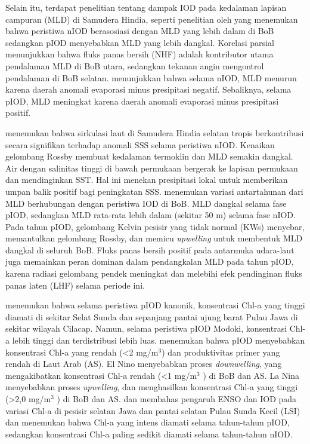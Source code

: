 \begin{spacing}{1.5}
	Selain itu, terdapat penelitian tentang dampak IOD pada kedalaman lapisan campuran (MLD) di Samudera Hindia, seperti penelitian oleh  yang menemukan bahwa peristiwa nIOD berasosiasi dengan MLD yang lebih dalam di BoB sedangkan pIOD menyebabkan MLD yang lebih dangkal. Korelasi parsial menunjukkan bahwa fluks panas bersih (NHF) adalah kontributor utama pendalaman MLD di BoB utara, sedangkan tekanan angin mengontrol pendalaman di BoB selatan.  menunjukkan bahwa selama nIOD, MLD menurun karena daerah anomali evaporasi minus presipitasi negatif. Sebaliknya, selama pIOD, MLD meningkat karena daerah anomali evaporasi minus presipitasi positif. 
	
	 menemukan bahwa sirkulasi laut di Samudera Hindia selatan tropis berkontribusi secara signifikan terhadap anomali SSS selama peristiwa nIOD. Kenaikan gelombang Rossby membuat kedalaman termoklin dan MLD semakin dangkal. Air dengan salinitas tinggi di bawah permukaan bergerak ke lapisan permukaan dan mendinginkan SST. Hal ini menekan presipitasi lokal untuk memberikan umpan balik positif bagi peningkatan SSS.  menemukan variasi antartahunan dari MLD berhubungan dengan peristiwa IOD di BoB. MLD dangkal selama fase pIOD, sedangkan MLD rata-rata lebih dalam (sekitar 50 m) selama fase nIOD. Pada tahun pIOD, gelombang Kelvin pesisir yang tidak normal (KWs) menyebar, memantulkan gelombang Rossby, dan memicu \textit{upwelling} untuk membentuk MLD dangkal di seluruh BoB. Fluks panas bersih positif pada antarmuka udara-laut juga memainkan peran dominan dalam pendangkalan MLD pada tahun pIOD, karena radiasi gelombang pendek meningkat dan melebihi efek pendinginan fluks panas laten (LHF) selama periode ini. 
	
	 menemukan bahwa selama peristiwa pIOD kanonik, konsentrasi Chl-a yang tinggi diamati di sekitar Selat Sunda dan sepanjang pantai ujung barat Pulau Jawa di sekitar wilayah Cilacap. Namun, selama peristiwa pIOD Modoki, konsentrasi Chl-a lebih tinggi dan terdistribusi lebih luas.  menemukan bahwa pIOD menyebabkan konsentrasi Chl-a yang rendah (<2 mg/m$^3$) dan produktivitas primer yang rendah di Laut Arab (AS). El Nino menyebabkan proses \textit{downwelling}, yang mengakibatkan konsentrasi Chl-a rendah (<1 mg/m$^3$ ) di BoB dan AS. La Nina menyebabkan proses \textit{upwelling}, dan menghasilkan konsentrasi Chl-a yang tinggi (>2,0 mg/m$^3$ ) di BoB dan AS.  dan  membahas pengaruh ENSO dan IOD pada variasi Chl-a di pesisir selatan Jawa dan pantai selatan Pulau Sunda Kecil (LSI) dan menemukan bahwa Chl-a yang intens diamati selama tahun-tahun pIOD, sedangkan konsentrasi Chl-a paling sedikit diamati selama tahun-tahun nIOD.
	

\end{spacing}
